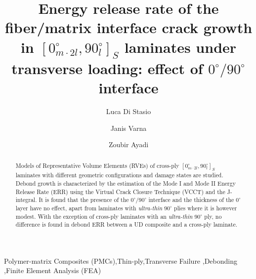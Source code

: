 \documentclass[review]{elsarticle}
\begin{document}
\begin{frontmatter}

\title{Energy release rate of the fiber/matrix interface crack growth in $\left[0_{m\cdot2l}^{\circ},90_{l}^{\circ}\right]_{S}$ laminates under transverse loading: effect of $0^{\circ}/90^{\circ}$ interface}


\author[nancy,lulea]{Luca Di Stasio}
\author[lulea]{Janis Varna}
\author[nancy]{Zoubir Ayadi}


\address[nancy]{Universit\'e de Lorraine, EEIGM, IJL, 6 Rue Bastien Lepage, F-54010 Nancy, France}
\address[lulea]{Lule\aa\ University of Technology, University Campus, SE-97187 Lule\aa, Sweden}

\begin{abstract}
\noindent
Models of Representative Volume Elements (RVEs) of cross-ply $\left[0_{m\cdot2l}^{\circ},90_{l}^{\circ}\right]_{S}$ laminates with different geometric configurations and damage states are studied. Debond growth is characterized by the estimation of the Mode I and Mode II Energy Release Rate (ERR) using the Virtual Crack Closure Technique (VCCT) and the J-integral. It is found that the presence of the $0^{\circ}/90^{\circ}$ interface and the thickness of the $0^{\circ}$ layer have no effect, apart from laminates with \emph{ultra-thin} $90^{\circ}$ plies where it is however modest. With the exception of cross-ply laminates with an \emph{ultra-thin} $90^{\circ}$ ply, no difference is found in debond ERR between a UD composite and a cross-ply laminate.
\end{abstract}

\begin{keyword}
Polymer-matrix Composites (PMCs)\sep Thin-ply\sep Transverse Failure \sep Debonding \sep Finite Element Analysis (FEA)
\end{keyword}


\end{frontmatter}
\end{document}
